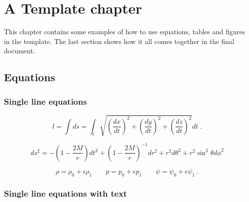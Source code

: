 \chapter{A Template chapter}
\label{chapter:example_chapter}

This chapter contains some examples of how to use equations, tables and figures in the template. The last section shows how it all comes together in the final document.


\section{Equations}

\subsection*{Single line equations}
\vspace{0.4cm}

\begin{equation}
	l = \int ds =  \int_t \sqrt{\left(\frac{dx}{dt} \right)^2 + \left(\frac{dy}{dt} \right)^2 + \left(\frac{dz}{dt} \right)^2} dt \; .
	\label{eq:curve_length_3D_cartesian}
\end{equation}

\vspace{0.4cm}

\begin{equation}
	ds^2 = -\left( 1 - \frac{2 M}{ r}  \right)  dt^2 + \left( 1 - \frac{2 M}{ r}  \right)^{-1} dr^2 + r^2 d \theta^2 + r^2 \sin^2 \theta d \phi^2
	\label{eq:schwarzschild_solution}
\end{equation}

\vspace{0.4cm}

\begin{equation}
	\rho = \rho_0 + \epsilon \rho_1 \qquad p = p_0 + \epsilon p_1 \qquad \psi = \psi_0 + \epsilon \psi_1 \; .
	\label{eq:linear_perturbations}
\end{equation}

\vspace{0.4cm}

\subsection*{Single line equations with text}

